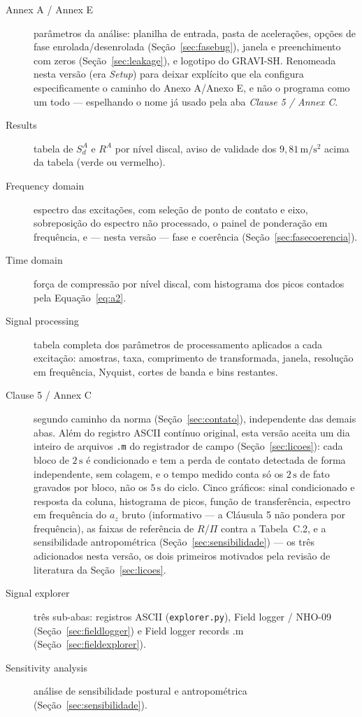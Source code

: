 \documentclass[11pt,a4paper]{article}
\newcommand{\code}[1]{\texttt{\small #1}}
\newcommand{\unit}[2]{\ensuremath{#1\,\mathrm{#2}}}
\begin{document}
\begin{description}
\item[Annex A / Annex E] parâmetros da análise: planilha de entrada, pasta de
      acelerações, opções de fase enrolada/desenrolada
      (Seção~\ref{sec:fasebug}), janela e preenchimento com zeros
      (Seção~\ref{sec:leakage}), e logotipo do GRAVI-SH. Renomeada nesta
      versão (era \emph{Setup}) para deixar explícito que ela configura
      especificamente o caminho do Anexo A/Anexo E, e não o programa como um
      todo --- espelhando o nome já usado pela aba \emph{Clause 5 / Annex C}.
\item[Results] tabela de $S_d^A$ e $R^A$ por nível discal, aviso de validade
      dos \unit{9{,}81}{m/s^2} acima da tabela (verde ou vermelho).
\item[Frequency domain] espectro das excitações, com seleção de ponto de
      contato e eixo, sobreposição do espectro não processado, o painel de
      ponderação em frequência, e --- nesta versão --- fase e coerência
      (Seção~\ref{sec:fasecoerencia}).
\item[Time domain] força de compressão por nível discal, com histograma dos
      picos contados pela Equação~\eqref{eq:a2}.
\item[Signal processing] tabela completa dos parâmetros de processamento
      aplicados a cada excitação: amostras, taxa, comprimento de transformada,
      janela, resolução em frequência, Nyquist, cortes de banda e bins
      restantes.
\item[Clause 5 / Annex C] segundo caminho da norma (Seção~\ref{sec:contato}),
      independente das demais abas. Além do registro ASCII contínuo original,
      esta versão aceita um dia inteiro de arquivos \code{.m} do registrador de
      campo (Seção~\ref{sec:licoes}): cada bloco de \unit{2}{s} é condicionado e
      tem a perda de contato detectada de forma independente, sem colagem, e o
      tempo medido conta só os \unit{2}{s} de fato gravados por bloco, não os
      \unit{5}{s} do ciclo. Cinco gráficos: sinal condicionado e resposta da
      coluna, histograma de picos, função de transferência, espectro em
      frequência do $a_z$ bruto (informativo --- a Cláusula 5 não pondera por
      frequência), as faixas de referência de $R$/$\Pi$ contra a Tabela~C.2, e
      a sensibilidade antropométrica (Seção~\ref{sec:sensibilidade}) --- os
      três adicionados nesta versão, os dois primeiros motivados pela revisão
      de literatura da Seção~\ref{sec:licoes}.
\item[Signal explorer] três sub-abas: registros ASCII (\code{explorer.py}),
      Field logger / NHO-09 (Seção~\ref{sec:fieldlogger}) e Field logger
      records .m (Seção~\ref{sec:fieldexplorer}).
\item[Sensitivity analysis] análise de sensibilidade postural e antropométrica
      (Seção~\ref{sec:sensibilidade}).
\end{description}
\end{document}
